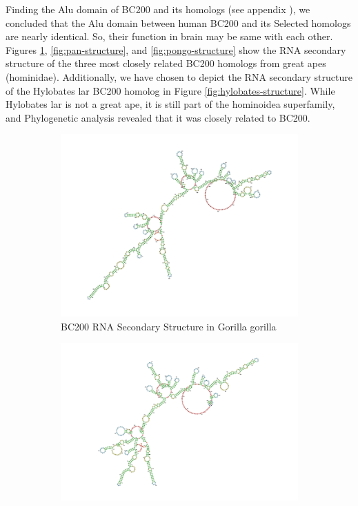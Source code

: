\documentclass[conference, 11pt]{IEEEtran}
\begin{document}
Finding the Alu domain of BC200 and its homologs (see appendix ), we concluded that the Alu domain between human BC200 and its Selected homologs are nearly identical. So, their function in brain may be same with each other. 
Figures \ref{fig:gorilla-structure}, \ref{fig:pan-structure}, and \ref{fig:pongo-structure} show the RNA secondary structure of the three most closely related BC200 homologs from great apes (hominidae). 
Additionally, we have chosen to depict the RNA secondary structure of the Hylobates lar BC200 homolog in Figure \ref{fig:hylobates-structure}. 
While Hylobates lar is not a great ape, it is still part of the hominoidea superfamily, and Phylogenetic analysis revealed that it was closely related to BC200.

\begin{figure}[h]
  \centering
  \begin{subfigure}[b]{0.4\textwidth}
    \centering
    \includegraphics[width=\textwidth]{figs/rnagorilla.png}
    \caption{BC200 RNA Secondary Structure in Gorilla gorilla}
    \label{fig:gorilla-structure}
  \end{subfigure}
  \hfill
  \begin{subfigure}[b]{0.4\textwidth}  
    \centering
    \includegraphics[width=\textwidth]{figs/rnapan.png}

\end{subfigure}
\end{figure}
\end{document}
